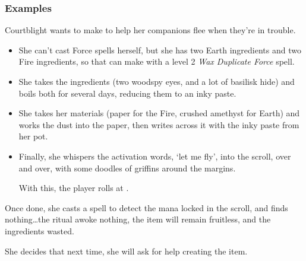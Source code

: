 \begin{multicols}{2}
\subsubsection*{Examples}

\begin{exampletext}
Courtblight wants to make  to help her companions flee when they're in trouble.

\begin{itemize}
  \item
  She can't cast Force spells herself, but she has two Earth \glspl{ingredient} and two Fire \glspl{ingredient}, so that can make  with a level 2 \textit{Wax Duplicate Force} spell.
  \item
  She takes the \glspl{ingredient} (two woodspy eyes, and a lot of basilisk hide) and boils both for several days, reducing them to an inky paste.
  \item
  She takes her materials (paper for the Fire, crushed amethyst for Earth) and works the dust into the paper, then writes across it with the inky paste from her pot.
  \item
  Finally, she whispers the activation words, `let me fly', into the scroll, over and over, with some doodles of griffins around the margins.

  With this, the player rolls  at \tn[14].
\end{itemize}

Once done, she casts a spell to detect the mana locked in the scroll, and finds nothing\ldots the ritual awoke nothing, the item will remain fruitless, and the \glspl{ingredient} wasted.

She decides that next time, she will ask for help creating the item.

\end{exampletext}

\end{multicols}

